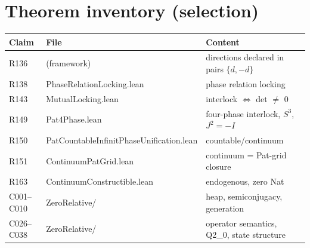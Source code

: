 \documentclass[sigplan,10pt,anonymous,review]{acmart}
\begin{document}
\section*{Theorem inventory (selection)}

\begin{center}
\small
\begin{tabular}{lll}
\toprule
Claim & File & Content \\
\midrule
R136 & (framework) & directions declared in pairs $\{d,-d\}$ \\
R138 & PhaseRelationLocking.lean & phase relation locking \\
R143 & MutualLocking.lean & interlock $\iff$ det $\neq$ 0 \\
R149 & Pat4Phase.lean & four-phase interlock, $S^3$, $J^2=-I$ \\
R150 & PatCountableInfinitPhaseUnification.lean & countable/continuum \\
R151 & ContinuumPatGrid.lean & continuum = Pat-grid closure \\
R163 & ContinuumConstructible.lean & endogenous, zero Nat \\
C001--C010 & ZeroRelative/ & heap, semiconjugacy, generation \\
C026--C038 & ZeroRelative/ & operator semantics, Q2\_0, state structure \\
\bottomrule
\end{tabular}
\end{center}



\end{document}
